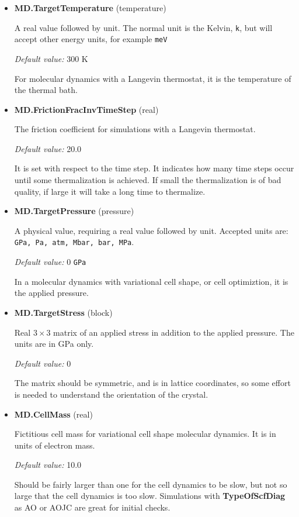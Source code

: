 \documentclass[11pt]{article}
\begin{document}
\begin{itemize}
   \item{\bf MD.TargetTemperature} (temperature)

   A real value followed by unit.  The normal unit is the Kelvin, \texttt{k},
   but will accept other energy units, for example \texttt{meV}

  \textit{Default value:}  300 K

   For molecular dynamics with a Langevin thermostat, it is the temperature of
   the thermal bath.

   \item{\bf MD.FrictionFracInvTimeStep} (real)

   The friction coefficient for simulations with a Langevin thermostat.

  \textit{Default value:}  20.0

   It is set with respect to the time step.
   It indicates how many time steps occur until some
   thermalization is achieved.  If small the thermalization is of bad quality,
   if large it will take a long time to thermalize.

   \item{\bf MD.TargetPressure} (pressure)

   A physical value, requiring a real value followed by unit.
   Accepted units are: \texttt{GPa, Pa, atm, Mbar, bar, MPa}.

  \textit{Default value:}  0  \texttt{GPa}

   In a molecular dynamics with variational cell shape, or cell optimiztion,
   it is the applied pressure.

   \item{\bf MD.TargetStress} (block)

   Real $3 \times 3$ matrix of an applied stress in addition to the applied pressure.
   The units are in GPa only.

  \textit{Default value:}  0

   The matrix should be symmetric, and is in lattice coordinates, so some effort
   is needed to understand the orientation of the crystal.

   \item{\bf MD.CellMass} (real)

   Fictitious cell mass for variational cell shape molecular dynamics.  It is in units
   of electron mass.

  \textit{Default value:}  10.0

   Should be fairly larger than one for the cell dynamics to be slow, but not so
   large that the cell dynamics is too slow.
   Simulations with {\bf TypeOfScfDiag} as AO or AOJC are great for initial checks.


\end{itemize}
\end{document}

